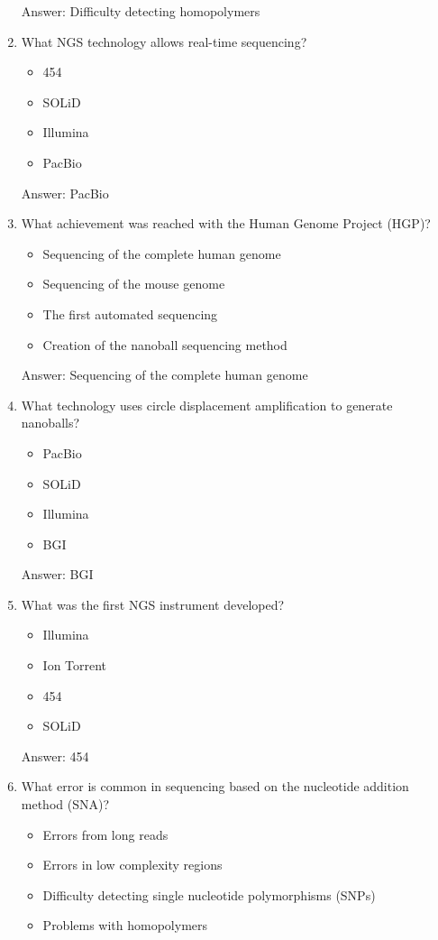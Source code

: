 \begin{enumerate}
Answer: Difficulty detecting homopolymers

\item What NGS technology allows real-time sequencing?
\begin{itemize}
\item 454
\item SOLiD
\item Illumina
\item PacBio
\end{itemize}

Answer: PacBio

\item What achievement was reached with the Human Genome Project (HGP)?
\begin{itemize}
\item Sequencing of the complete human genome
\item Sequencing of the mouse genome
\item The first automated sequencing
\item Creation of the nanoball sequencing method
\end{itemize}

Answer: Sequencing of the complete human genome

\item What technology uses circle displacement amplification to generate nanoballs?
\begin{itemize}
\item PacBio
\item SOLiD
\item Illumina
\item BGI
\end{itemize}

Answer: BGI

\item What was the first NGS instrument developed?
\begin{itemize}
\item Illumina
\item Ion Torrent
\item 454
\item SOLiD
\end{itemize}

Answer: 454

\item What error is common in sequencing based on the nucleotide addition method (SNA)?
\begin{itemize}
\item Errors from long reads
\item Errors in low complexity regions
\item Difficulty detecting single nucleotide polymorphisms (SNPs)
\item Problems with homopolymers
\end{itemize}


\end{enumerate}
